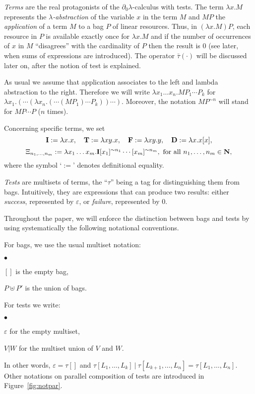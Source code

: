 \documentclass{LMCS}
\newcommand{\nat}{\mathbf{N}}
\newcommand{\dzlam}{\ensuremath{\partial_0\lambda}}
\newcommand{\lam}{\ensuremath{\lambda}}
\newcommand{\paral}{\vert}
\newcommand{\mcup}{\uplus}
\newcommand{\ass}{:=}
\newcommand{\gt}{\ensuremath{\tau}}
\newcommand{\gto}{\ensuremath{\bar\tau}}
\begin{document}
\emph{Terms} are the real protagonists of the \dzlam-calculus with tests. The term $\lam x.M$ represents the \emph{\lam-abstraction} of the variable $x$ in the
 term $M$ and $MP$ the \emph{application} of a term $M$ to a bag $P$ of linear resources. Thus, in $(\lam x.M)P$, each resource in $P$ is available exactly once for
 $\lam x.M$ and if the number of occurrences of $x$ in $M$ ``disagrees'' with the cardinality of $P$ then the result is 0 (see later, when sums of expressions are
 introduced). The operator $\gto(\cdot)$  will be discussed later on, after the notion of test is explained.

As usual we assume that application associates to the left and lambda abstraction to the right.
Therefore we will write $\lam x_1\dots x_n.MP_1\cdots P_k$ for $\lam x_1.(\cdots(\lam x_n.(\cdots(MP_1)\cdots P_k))\cdots)$.
Moreover, the notation $MP^{\sim n}$ will stand for $MP\cdots P$ ($n$ times).

\begin{nota}
Concerning specific terms, we set 
$$
	\bold{I}\ass \lam x.x,\quad \bold{T}\ass \lam xy.x,\quad \bold{F} \ass \lam xy.y,\quad \bold{D}:=\lam x.x[x],
$$ 
$$
	\Xi_{n_1,\ldots,n_m} \ass \lam x_1\dots x_m.\bold{I}[x_1]^{\sim n_1}\cdots [x_m]^{\sim n_m},\textrm{ for all }n_1,\dots,n_m\in\nat,
$$
where the symbol `$\ass$' denotes definitional equality.
\end{nota}
 
{\em Tests} are multisets of terms, the ``$\gt$'' being a tag for distinguishing them from bags. 
Intuitively, they are expressions that can produce two results: either {\em success}, represented by $\varepsilon$, or {\em failure}, represented by $0$.

Throughout the paper, we will enforce the distinction between bags and tests by using systematically the following notational conventions.

\begin{nota}
For bags, we use the usual multiset notation: 
\begin{iteMize}{$\bullet$}
\item $[]$ is the empty bag,
\item $P\mcup P'$ is the union of bags.
\end{iteMize}
For tests we write: 
\begin{iteMize}{$\bullet$}
\item $\varepsilon$ for the empty multiset, 
\item $V \paral W$ for the multiset union of $V$ and $W$. 
\end{iteMize}
In other words, $\varepsilon=\gt[]$ and $\gt [L_1,\ldots,L_k]\  \paral\  \gt [L_{k+1},\ldots,L_n]=\gt [L_1,\ldots,L_n]$.
Other notations on parallel composition of tests are introduced in Figure~\ref{fig:notpar}.
\end{nota}
\end{document}
